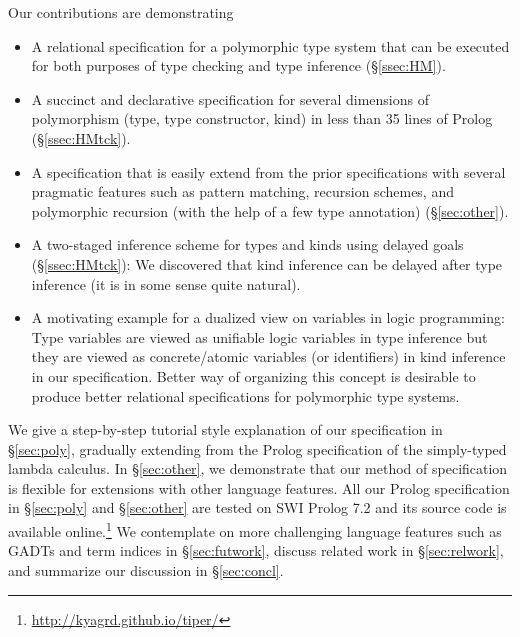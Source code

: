 Our contributions are demonstrating
\begin{itemize}\vspace*{-1ex}
\item A relational specification for a polymorphic type system that can be
	executed for both purposes of type checking and type inference
	(\S\ref{ssec:HM}).
\item A succinct and declarative specification for several dimensions of
	polymorphism (type, type constructor, kind) in less than 35 lines
	of Prolog (\S\ref{ssec:HMtck}).
\item A specification that is easily extend from the prior specifications
	with several pragmatic features such as pattern matching,
	recursion schemes, and polymorphic recursion (with the help of
	a few type annotation) (\S\ref{sec:other}).
\item A two-staged inference scheme for types and kinds using delayed goals
	(\S\ref{ssec:HMtck}):
	We discovered that kind inference can be delayed after type inference
	(it is in some sense quite natural).
\item A motivating example for a dualized view on variables
	in logic programming:
	Type variables are viewed as unifiable logic variables
	in type inference but they are viewed as concrete/atomic
	variables (or identifiers) in kind inference in our specification.
	Better way of organizing this concept is desirable to produce
	better relational specifications for polymorphic type systems.
\end{itemize}

We give a step-by-step tutorial style explanation of our specification in
\S\ref{sec:poly}, gradually extending from the Prolog specification of
the simply-typed lambda calculus. In \S\ref{sec:other}, we demonstrate
that our method of specification is flexible for extensions with
other language features. All our Prolog specification in \S\ref{sec:poly}
and \S\ref{sec:other} are tested on SWI Prolog 7.2 and its source code is
available online.\footnote{
	\url{http://kyagrd.github.io/tiper/} }\label{githubURL}
We contemplate on more challenging language features such as GADTs and
term indices in \S\ref{sec:futwork}, discuss related work in
\S\ref{sec:relwork}, and summarize our discussion in \S\ref{sec:concl}.


